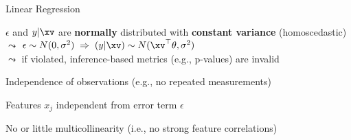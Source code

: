 \documentclass[10pt,compress,t,notes=noshow,xcolor=table]{beamer}
\begin{document}
\begin{framev}[align=top]{Linear Regression}
\begin{itemizeM}
\item<+-> $\epsilon$ and $y \vert \xv$ are \textbf{normally} distributed with \textbf{constant variance} (homoscedastic)\\
$\leadsto$ $\epsilon \sim N(0, \sigma^2) \; \Rightarrow \; (y \vert \xv) \sim N(\xv^\top \theta, \sigma^2)$\\
$\leadsto$ if violated, inference-based metrics (e.g., p-values) are invalid
\item<+-> Independence of observations (e.g., no repeated measurements) %
\item<+-> Features $x_j$ independent from error term $\epsilon$
\item<+-> No or little multicollinearity (i.e., no strong feature correlations)
\end{itemizeM}
\end{framev}

\end{document}
